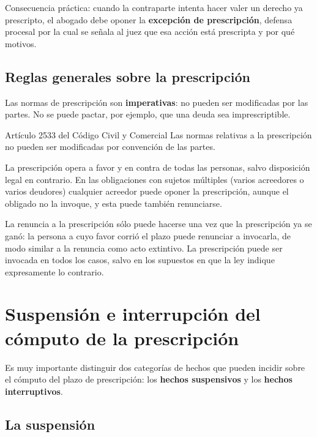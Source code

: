 \documentclass[12pt,oneside]{book}
\begin{document}
Consecuencia práctica: cuando la contraparte intenta hacer valer un derecho ya prescripto, el abogado debe oponer la \textbf{excepción de prescripción}, defensa procesal por la cual se señala al juez que esa acción está prescripta y por qué motivos.

\subsection{Reglas generales sobre la prescripción}

Las normas de prescripción son \textbf{imperativas}: no pueden ser modificadas por las partes. No se puede pactar, por ejemplo, que una deuda sea imprescriptible.

\begin{articulo}{Artículo 2533 del Código Civil y Comercial}
Las normas relativas a la prescripción no pueden ser modificadas por convención de las partes.
\end{articulo}

La prescripción opera a favor y en contra de todas las personas, salvo disposición legal en contrario. En las obligaciones con sujetos múltiples (varios acreedores o varios deudores) cualquier acreedor puede oponer la prescripción, aunque el obligado no la invoque, y esta puede también renunciarse. %

La renuncia a la prescripción sólo puede hacerse una vez que la prescripción ya se ganó: la persona a cuyo favor corrió el plazo puede renunciar a invocarla, de modo similar a la renuncia como acto extintivo. La prescripción puede ser invocada en todos los casos, salvo en los supuestos en que la ley indique expresamente lo contrario.

\section{Suspensión e interrupción del cómputo de la prescripción}

Es muy importante distinguir dos categorías de hechos que pueden incidir sobre el cómputo del plazo de prescripción: los \textbf{hechos suspensivos} y los \textbf{hechos interruptivos}.

\subsection{La suspensión}
\end{document}
